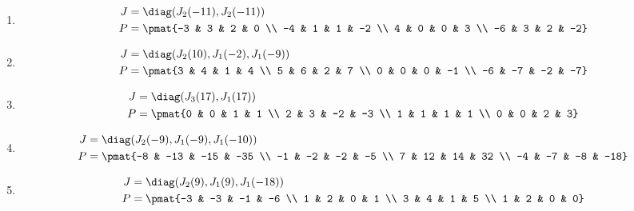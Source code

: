 \begin{enumerate}
\item

\begin{align*}
J &= \diag(J_{2}(-11), J_{2}(-11))\\
P &= \pmat{-3 & 3 & 2 & 0 \\ -4 & 1 & 1 & -2 \\ 4 & 0 & 0 & 3 \\ -6 & 3 & 2 & -2}
\end{align*}

\item

\begin{align*}
J &= \diag(J_{2}(10), J_{1}(-2), J_{1}(-9))\\
P &= \pmat{3 & 4 & 1 & 4 \\ 5 & 6 & 2 & 7 \\ 0 & 0 & 0 & -1 \\ -6 & -7 & -2 & -7}
\end{align*}

\item

\begin{align*}
J &= \diag(J_{3}(17), J_{1}(17))\\
P &= \pmat{0 & 0 & 1 & 1 \\ 2 & 3 & -2 & -3 \\ 1 & 1 & 1 & 1 \\ 0 & 0 & 2 & 3}
\end{align*}

\item

\begin{align*}
J &= \diag(J_{2}(-9), J_{1}(-9), J_{1}(-10))\\
P &= \pmat{-8 & -13 & -15 & -35 \\ -1 & -2 & -2 & -5 \\ 7 & 12 & 14 & 32 \\ -4 & -7 & -8 & -18}
\end{align*}

\item

\begin{align*}
J &= \diag(J_{2}(9), J_{1}(9), J_{1}(-18))\\
P &= \pmat{-3 & -3 & -1 & -6 \\ 1 & 2 & 0 & 1 \\ 3 & 4 & 1 & 5 \\ 1 & 2 & 0 & 0}
\end{align*}


\end{enumerate}
